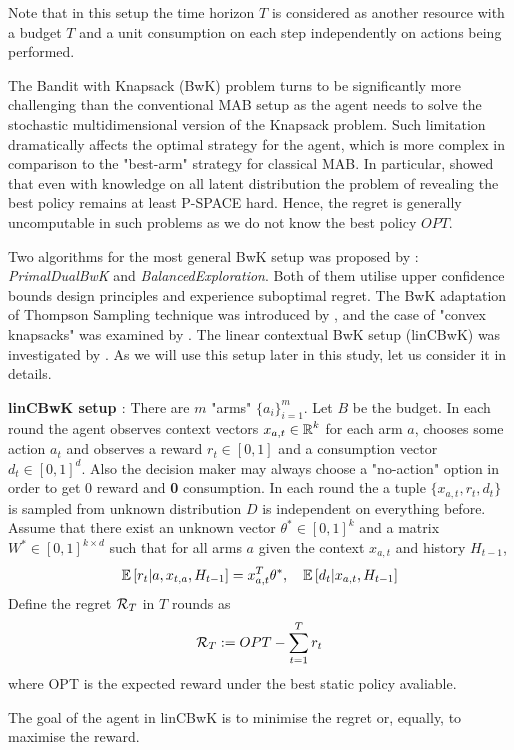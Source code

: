  
  Note that in this setup the time horizon $T$ is considered as another resource with a budget $T$ and a unit consumption on each step independently on actions being performed.
  
  The Bandit with Knapsack (BwK) problem turns to be significantly more challenging than the conventional MAB setup as the agent needs to solve the stochastic multidimensional version of the Knapsack problem. Such limitation dramatically affects the optimal strategy for the agent, which is more complex in comparison to the "best-arm" strategy for classical MAB. In particular, \cite{Papadimitriou1999} showed that even with knowledge on all latent distribution the problem of revealing the best policy remains at least P-SPACE hard. Hence, the regret is generally uncomputable in such problems as we do not know the best policy $OPT$. 
  
  Two algorithms for the most general BwK setup was proposed by \cite{Badanidiyuru2013}: \textit{PrimalDualBwK} and \textit{BalancedExploration}. Both of them utilise upper confidence bounds design principles and experience suboptimal regret. The BwK adaptation of Thompson Sampling technique was introduced by \cite{Xia2015}, and the case of "convex knapsacks" was examined by \cite{Agrawal2014}. The linear contextual BwK setup (linCBwK) was investigated by \cite{Agrawal2015}. As we will use this setup later in this study, let us consider it in details.
  
  \begin{definition}
    \label{def:lincbwk_setup}
   \textbf{linCBwK setup \cite{Agrawal2015}}:
      There are $m$ "arms" $\{a_i\}_{i=1}^m$. Let $B$ be the budget. In each round the agent observes context vectors $x_{a,t} \in \operatorname{\mathbb{R}}^k$ for each arm $a$, chooses some action $a_t$ and observes a reward $r_t \in [0, 1]$ and a consumption vector $d_t \in [0,1]^d$. Also the decision maker may always choose a "no-action" option in order to get 0 reward and \textbf{0} consumption. In each round the a tuple $\{x_{a,t}, r_t, d_t\}$ is sampled from unknown distribution $D$ is independent on everything before. Assume that there exist an unknown vector $\theta^* \in [0,1]^k$ and a matrix $W^* \in [0,1]^{k \times d}$ such that for all arms $a$ given the context $x_{a,t}$ and history $H_{t-1}$,
      \[
        \operatorname{\mathbb{E}}\left[r_t|a, x_{t,a}, H_{t-1}\right] = x_{a,t}^T\theta^*, \quad \operatorname{\mathbb{E}}\left[d_{t}|x_{a,t}, H_{t-1} \right]
      \]
      Define the regret $\operatorname{\mathcal{R}}_T$ in $T$ rounds as 
      \[
        \operatorname{\mathcal{R}}_T := OPT - \sum_{t=1}^T r_t
      \]
      where OPT is the expected reward under the best static policy avaliable. 
      
      The goal of the agent in linCBwK is to minimise the regret or, equally, to maximise the reward. 
      
  \end{definition} 

